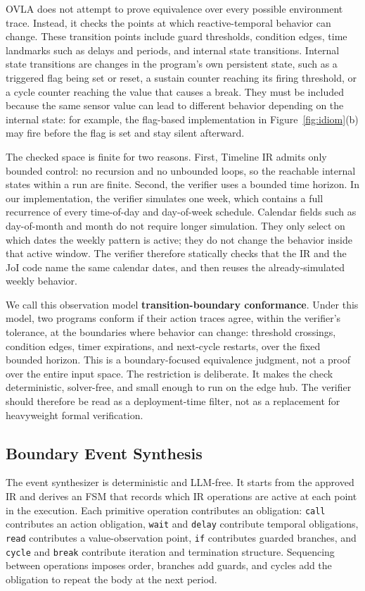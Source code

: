 \documentclass[sigconf,nonacm,anonymous,review]{acmart}
\begin{document}
OVLA does not attempt to prove equivalence over every possible environment trace. Instead, it checks the points at which reactive-temporal behavior can change. These transition points include guard thresholds, condition edges, time landmarks such as delays and periods, and internal state transitions. Internal state transitions are changes in the program's own persistent state, such as a triggered flag being set or reset, a sustain counter reaching its firing threshold, or a cycle counter reaching the value that causes a break. They must be included because the same sensor value can lead to different behavior depending on the internal state: for example, the flag-based implementation in Figure~\ref{fig:idiom}(b) may fire before the flag is set and stay silent afterward.

The checked space is finite for two reasons. First, Timeline IR admits only bounded control: no recursion and no unbounded loops, so the reachable internal states within a run are finite. Second, the verifier uses a bounded time horizon. In our implementation, the verifier simulates one week, which contains a full recurrence of every time-of-day and day-of-week schedule. Calendar fields such as day-of-month and month do not require longer simulation. They only select on which dates the weekly pattern is active; they do not change the behavior inside that active window. The verifier therefore statically checks that the IR and the JoI code name the same calendar dates, and then reuses the already-simulated weekly behavior.

We call this observation model \textbf{transition-boundary conformance}. Under this model, two programs conform if their action traces agree, within the verifier's tolerance, at the boundaries where behavior can change: threshold crossings, condition edges, timer expirations, and next-cycle restarts, over the fixed bounded horizon. This is a boundary-focused equivalence judgment, not a proof over the entire input space. The restriction is deliberate. It makes the check deterministic, solver-free, and small enough to run on the edge hub. The verifier should therefore be read as a deployment-time filter, not as a replacement for heavyweight formal verification.

\subsection{Boundary Event Synthesis}

The event synthesizer is deterministic and LLM-free. It starts from the approved IR and derives an FSM that records which IR operations are active at each point in the execution. Each primitive operation contributes an obligation: \texttt{call} contributes an action obligation, \texttt{wait} and \texttt{delay} contribute temporal obligations, \texttt{read} contributes a value-observation point, \texttt{if} contributes guarded branches, and \texttt{cycle} and \texttt{break} contribute iteration and termination structure. Sequencing between operations imposes order, branches add guards, and cycles add the obligation to repeat the body at the next period.
\end{document}
